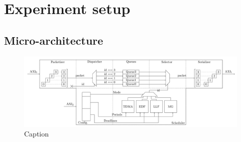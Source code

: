 \section{Experiment setup}
    \subsection{Micro-architecture}
        \begin{figure}
            \centering
            \includegraphics[scale=0.08]{images/MemorEDF_module_schema.png}
            \caption{Caption}
            \label{fig:MemorEDF_module_schema}
        \end{figure}